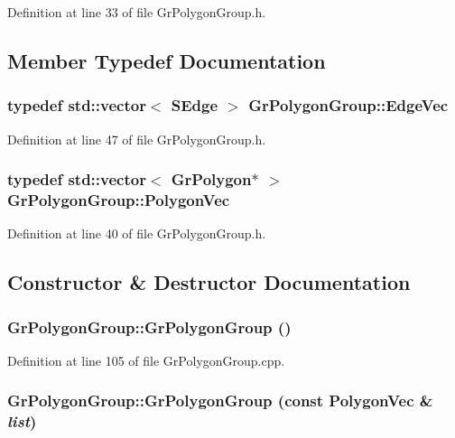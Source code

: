 Definition at line 33 of file GrPolygonGroup.h.

\subsection{Member Typedef Documentation}
\hypertarget{class_gr_polygon_group_8b3e2128f854d70f9d500ae00dafe5bd}{
\subsubsection[{EdgeVec}]{\setlength{\rightskip}{0pt plus 5cm}typedef std::vector$<$ {\bf SEdge} $>$ {\bf GrPolygonGroup::EdgeVec}}}
\label{class_gr_polygon_group_8b3e2128f854d70f9d500ae00dafe5bd}




Definition at line 47 of file GrPolygonGroup.h.\hypertarget{class_gr_polygon_group_af5dedb77a4dc642d9fcca85710c3cf5}{
\subsubsection[{PolygonVec}]{\setlength{\rightskip}{0pt plus 5cm}typedef std::vector$<$ {\bf GrPolygon}$\ast$ $>$ {\bf GrPolygonGroup::PolygonVec}}}
\label{class_gr_polygon_group_af5dedb77a4dc642d9fcca85710c3cf5}




Definition at line 40 of file GrPolygonGroup.h.

\subsection{Constructor \& Destructor Documentation}
\hypertarget{class_gr_polygon_group_aa3b23b7e01fc2b036a5b9826f95948a}{
\subsubsection[{GrPolygonGroup}]{\setlength{\rightskip}{0pt plus 5cm}GrPolygonGroup::GrPolygonGroup ()}}
\label{class_gr_polygon_group_aa3b23b7e01fc2b036a5b9826f95948a}




Definition at line 105 of file GrPolygonGroup.cpp.\hypertarget{class_gr_polygon_group_be9925f6b0511d2130e51891e6e685b5}{
\subsubsection[{GrPolygonGroup}]{\setlength{\rightskip}{0pt plus 5cm}GrPolygonGroup::GrPolygonGroup (const {\bf PolygonVec} \& {\em list})}}
\label{class_gr_polygon_group_be9925f6b0511d2130e51891e6e685b5}




